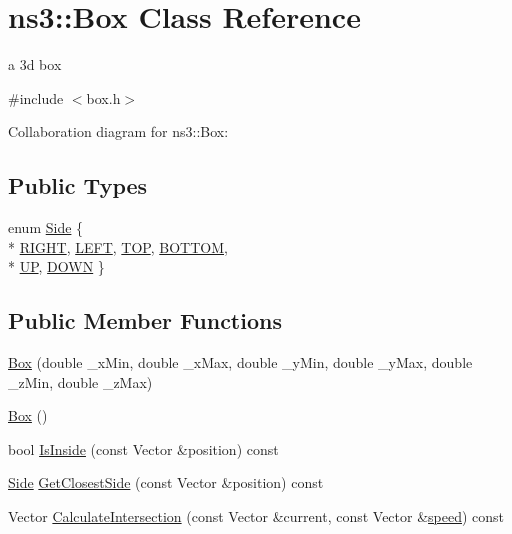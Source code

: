\hypertarget{classns3_1_1Box}{}\section{ns3\+:\+:Box Class Reference}
\label{classns3_1_1Box}


a 3d box  




{\ttfamily \#include $<$box.\+h$>$}



Collaboration diagram for ns3\+:\+:Box\+:
\subsection*{Public Types}
\begin{DoxyCompactItemize}
\item 
enum \hyperlink{classns3_1_1Box_a30fa910da32787c6c19adcbed2fab47c}{Side} \{ \\*
\hyperlink{classns3_1_1Box_a30fa910da32787c6c19adcbed2fab47ca26784bec61d164bafa1593567156df5e}{R\+I\+G\+HT}, 
\hyperlink{classns3_1_1Box_a30fa910da32787c6c19adcbed2fab47cab866198876b6abfa6b9a1b71e48525df}{L\+E\+FT}, 
\hyperlink{classns3_1_1Box_a30fa910da32787c6c19adcbed2fab47cac9efcb84d7661384dd2cedaf9b0dcc17}{T\+OP}, 
\hyperlink{classns3_1_1Box_a30fa910da32787c6c19adcbed2fab47caa475d832f1dfeff92591f466dd8c084f}{B\+O\+T\+T\+OM}, 
\\*
\hyperlink{classns3_1_1Box_a30fa910da32787c6c19adcbed2fab47ca3c433b9f9759647cc41b612d535a186e}{UP}, 
\hyperlink{classns3_1_1Box_a30fa910da32787c6c19adcbed2fab47ca9afc8e58f059721e122a75e64b2fb5bb}{D\+O\+WN}
 \}
\end{DoxyCompactItemize}
\subsection*{Public Member Functions}
\begin{DoxyCompactItemize}
\item 
\hyperlink{classns3_1_1Box_a951fd48aff7c7bb527000c1912461f71}{Box} (double \+\_\+x\+Min, double \+\_\+x\+Max, double \+\_\+y\+Min, double \+\_\+y\+Max, double \+\_\+z\+Min, double \+\_\+z\+Max)
\item 
\hyperlink{classns3_1_1Box_ac3115596a4e8791b93d985b169640afe}{Box} ()
\item 
bool \hyperlink{classns3_1_1Box_abc69bd930a2476a82dac530570ce0a73}{Is\+Inside} (const Vector \&position) const 
\item 
\hyperlink{classns3_1_1Box_a30fa910da32787c6c19adcbed2fab47c}{Side} \hyperlink{classns3_1_1Box_af5af91deb86970d9b7b46b03fb714810}{Get\+Closest\+Side} (const Vector \&position) const 
\item 
Vector \hyperlink{classns3_1_1Box_ae30ec8fd32f923d6121ddc24931bc629}{Calculate\+Intersection} (const Vector \&current, const Vector \&\hyperlink{mmwave-amc-test_8cc_a6dc6e6f3c75c509ce943163afb5dade7}{speed}) const 
\end{DoxyCompactItemize}
